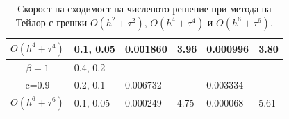 \documentclass{beamer}
\begin{document}
\begin{frame}
\begin{table}[ht]
{\begin{tabular}{||c|l|ll|ll||}
 $O(h^4+ \tau^4)$ 	&0.1, 0.05   	&0.001860 	& 3.96  & 0.000996  & 3.80  \\
\hline
  $\beta=1$     		&0.4, 0.2   	&            	&          	&                  &      \\
      c=0.9                  &0.2, 0.1   	&0.006732 	&            & 0.003334      &       \\
 $O(h^6+ \tau^6)$ 	&0.1, 0.05 	& 0.000249 	& 4.75 	& 0.000068  & 5.61        \\
\hline
\hline 
		\end{tabular}
		}%
		\caption{Скорост на сходимост на численото решение при метода на Тейлор с грешки $O(h^{2} + \tau^2 )$, $O(h^{4} + \tau^4 )$ и $O(h^{6} + \tau^6 )$. }
\label{table:A}
\end{table}

\end{frame}
\end{document}
